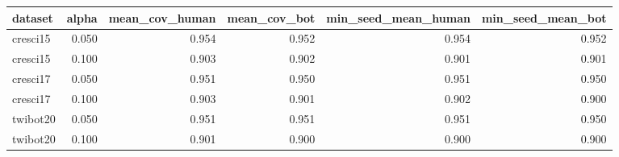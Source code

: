 \begin{tabular}{lrrrrr}
\toprule
dataset & alpha & mean_cov_human & mean_cov_bot & min_seed_mean_human & min_seed_mean_bot \\
\midrule
cresci15 & 0.050 & 0.954 & 0.952 & 0.954 & 0.952 \\
cresci15 & 0.100 & 0.903 & 0.902 & 0.901 & 0.901 \\
cresci17 & 0.050 & 0.951 & 0.950 & 0.951 & 0.950 \\
cresci17 & 0.100 & 0.903 & 0.901 & 0.902 & 0.900 \\
twibot20 & 0.050 & 0.951 & 0.951 & 0.951 & 0.950 \\
twibot20 & 0.100 & 0.901 & 0.900 & 0.900 & 0.900 \\
\bottomrule
\end{tabular}
